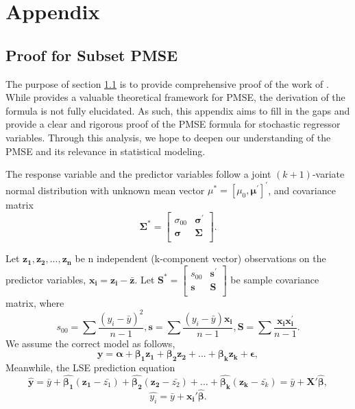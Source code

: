 \chapter{Appendix}

\section{Proof for Subset PMSE}
\label{Proof for Subset PMSE}
The purpose of section \ref{Proof for Subset PMSE} is to provide comprehensive proof of the work of \cite{narula1974predictive}. While \cite{narula1974predictive} provides a valuable theoretical framework for PMSE, the derivation of the formula is not fully elucidated. As such, this appendix aims to fill in the gaps and provide a clear and rigorous proof of the PMSE formula for stochastic regressor variables. Through this analysis, we hope to deepen our understanding of the PMSE and its relevance in statistical modeling.

The response variable and the predictor variables follow a joint
 $(k+ 1)$-variate normal distribution with unknown mean vector $\mu^{*}=[\mu_{0},\boldsymbol{\mu^{'}}]^{'}$, and covariance matrix 
$$ \boldsymbol{\Sigma^{*}}  =    
 \begin{bmatrix} 
    \sigma_{00} & \boldsymbol{\sigma^{'}} \\  
    \boldsymbol{\sigma} & \boldsymbol{\Sigma} \\  
\end{bmatrix}.$$ 

Let $\boldsymbol {z_1, z_2,..., z_n}$ be n independent (k-component vector) observations on the predictor variables, $\boldsymbol{x_i=z_i-\bar{z}}$. Let $ \boldsymbol{S^{*}}  =    
 \begin{bmatrix} 
    s_{00} & \boldsymbol{s^{'}} \\  
    \boldsymbol{s} & \boldsymbol{S} \\  
\end{bmatrix}$ be sample covariance matrix, where 
$$s_{00}=\sum{\frac{(y_i-\bar{y})^2}{n-1}},\boldsymbol{s}=\sum{\frac{(y_i-\bar{y})\boldsymbol{x_i}}{n-1}}, \boldsymbol{S}=\sum{\frac{\boldsymbol{x_{i}x_{i}^{'}}}{n-1}}.
$$
We assume the correct model as follows,
$$\boldsymbol{y=\alpha+ \beta_1z_1+\beta_2z_2+...+\beta_kz_k+\epsilon},$$
Meanwhile, the LSE prediction equation 
$$
\boldsymbol{\hat{y}}=\bar{y}+\boldsymbol{\hat{\beta_1}}(\boldsymbol{z_1}-\bar{z_1})+\boldsymbol{\hat{\beta_2}}(\boldsymbol{z_2}-\bar{z_2})+...+\boldsymbol{\hat{\beta_k}}(\boldsymbol{z_k}-\bar{z_k})=\bar{y}+\boldsymbol{X'\hat{\beta}},$$
$$\hat{y_i}=\bar{y}+\boldsymbol{x_{i}'\hat{\beta}}.
$$

